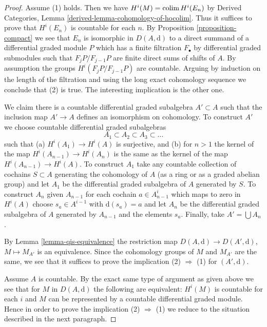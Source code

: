 \begin{proof}
Assume (1) holds. Then we have $H^i(M) = \mathop{\mathrm{colim}}\nolimits H^i(E_n)$ by
Derived Categories, Lemma \ref{derived-lemma-cohomology-of-hocolim}.
Thus it suffices to prove that $H^i(E_n)$ is countable for each $n$.
By Proposition \ref{proposition-compact} we see that $E_n$
is isomorphic in $D(A, \text{d})$ to a direct summand of a
differential graded module $P$ which has a finite filtration
$F_\bullet$ by differential graded submodules
such that $F_jP/F_{j - 1}P$ are finite direct sums of shifts of $A$.
By assumption the groups $H^i(F_jP/F_{j - 1}P)$ are countable.
Arguing by induction on the length of the filtration and using
the long exact cohomology sequence we conclude that (2) is true.
The interesting implication is the other one.

\medskip\noindent
We claim there is a countable differential graded
subalgebra $A' \subset A$ such that the inclusion map
$A' \to A$ defines an isomorphism on cohomology.
To construct $A'$ we choose countable differential graded
subalgebras
$$
A_1 \subset A_2 \subset A_3 \subset \ldots
$$
such that (a) $H^i(A_1) \to H^i(A)$ is surjective, and (b)
for $n > 1$ the kernel of the map $H^i(A_{n - 1}) \to H^i(A_n)$
is the same as the kernel of the map $H^i(A_{n - 1}) \to H^i(A)$.
To construct $A_1$ take any countable collection of cochains
$S \subset A$ generating the cohomology of $A$ (as a ring or as
a graded abelian group) and let
$A_1$ be the differential graded subalgebra of $A$ generated by $S$.
To construct $A_n$ given $A_{n - 1}$ for each cochain $a \in A_{n - 1}^i$
which maps to zero in $H^i(A)$ choose $s_a \in A^{i - 1}$
with $\text{d}(s_a) = a$ and let $A_n$ be the differential graded
subalgebra of $A$ generated by $A_{n - 1}$ and the elements $s_a$.
Finally, take $A' = \bigcup A_n$.

\medskip\noindent
By Lemma \ref{lemma-qis-equivalence}
the restriction map $D(A, \text{d}) \to D(A', \text{d})$,
$M \mapsto M_{A'}$ is an equivalence. Since the cohomology
groups of $M$ and $M_{A'}$ are the same, we see that it
suffices to prove the implication (2) $\Rightarrow$ (1)
for $(A', \text{d})$.

\medskip\noindent
Assume $A$ is countable. By the exact same type of argument as
given above we see that for $M$ in $D(A, \text{d})$
the following are equivalent: $H^i(M)$ is countable for each $i$
and $M$ can be represented by a countable differential graded module.
Hence in order to prove the implication (2) $\Rightarrow$ (1)
we reduce to the situation described in the next paragraph.


\end{proof}
